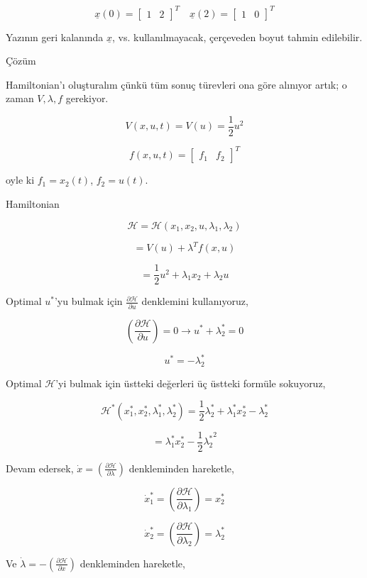 \documentclass[12pt,fleqn]{article}\usepackage{../../common}
\begin{document}
$$
\underline{x}(0) = \left[\begin{array}{cc} 1 & 2 \end{array}\right]^T \quad 
\underline{x}(2) = \left[\begin{array}{cc} 1 & 0 \end{array}\right]^T 
$$

Yazının geri kalanında $\underline{x}$, vs. kullanılmayacak, çerçeveden
boyut tahmin edilebilir.

Çözüm

Hamiltonian'ı oluşturalım çünkü tüm sonuç türevleri ona göre alınıyor
artık; o zaman $V,\lambda,f$ gerekiyor. 

$$
V(x,u,t) = V(u) = \frac{1}{2} u^2
$$

$$
f(x,u,t) = \left[\begin{array}{cc} f_1 & f_2 \end{array}\right]^T
$$

oyle ki $f_1 = x_2(t)$, $f_2 = u(t)$. 

Hamiltonian

$$
\mathcal{H} = \mathcal{H}(x_1, x_2, u, \lambda_1, \lambda_2)
$$

$$
= V(u) + \lambda^T f(x,u)
$$

$$
= \frac{1}{2} u^2 + \lambda_1 x_2 + \lambda_2 u 
$$

Optimal $u^\ast$'yu bulmak için $\frac{\partial \mathcal{H}}{\partial u}$
denklemini kullanıyoruz,

$$
\left( \frac{\partial \mathcal{H}}{\partial u} \right) = 0 \to
u^\ast + \lambda_2^\ast = 0
$$

$$
u^\ast = -\lambda_2^\ast
$$

Optimal $\mathcal{H}$'yi bulmak için üstteki değerleri üç üstteki
formüle sokuyoruz, 

$$
\mathcal{H}^\ast(x_1^\ast, x_2^\ast,\lambda_1^\ast,\lambda_2^\ast) = 
\frac{1}{2} \lambda_2^\ast + \lambda_1^\ast x_2^\ast - \lambda_2^\ast 
$$

$$
= \lambda_1^\ast x_2^\ast - \frac{1}{2} {\lambda_2^\ast}^2  
$$

Devam edersek, $\dot{x} = \left( \frac{\partial \mathcal{H}}{\partial
\lambda} \right)$  denkleminden hareketle,

$$
\dot{x}^\ast_1 = \left( \frac{\partial \mathcal{H}}{\partial \lambda_1} \right) =
x_2^\ast
$$

$$
\dot{x}^\ast_2 = \left( \frac{\partial \mathcal{H}}{\partial \lambda_2} \right) =
\lambda_2^\ast
$$

Ve $\dot{\lambda} = - \left( \frac{\partial \mathcal{H}}{\partial x}
\right)$ denkleminden hareketle,
\end{document}
